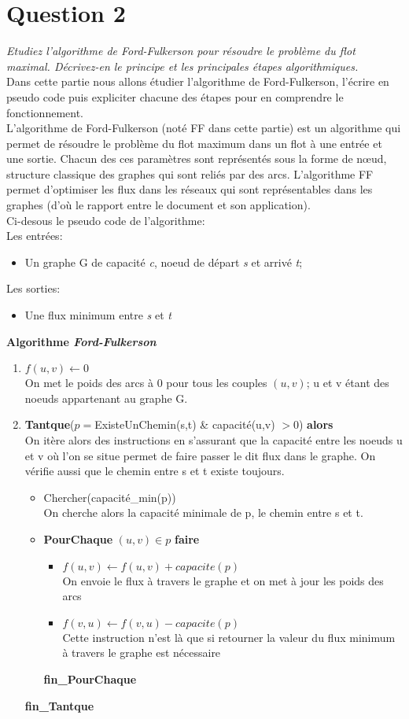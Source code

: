 \section{Question 2}
\textit{Etudiez l'algorithme de Ford-Fulkerson pour résoudre le problème du flot maximal. Décrivez-en le principe et les principales étapes algorithmiques.}\\
Dans cette partie nous allons étudier l’algorithme de Ford-Fulkerson, l’écrire en pseudo code puis expliciter chacune des étapes pour en comprendre le fonctionnement.\\
L'algorithme de Ford-Fulkerson (noté FF dans cette partie) est un algorithme qui permet de résoudre le problème du flot maximum dans un flot à une entrée et une sortie. Chacun des ces paramètres sont représentés sous la forme de nœud, structure classique des graphes qui sont reliés par des arcs. L’algorithme FF permet d'optimiser les flux dans les réseaux qui sont représentables dans les graphes (d'où le rapport entre le document et son application).\\
Ci-desous le pseudo code de l'algorithme:\\
Les entrées:\begin{itemize}
\item Un graphe G de capacité \textit{c}, noeud de départ \textit{s} et arrivé \textit{t};
\end{itemize}
Les sorties:\begin{itemize}
\item Une flux minimum entre \textit{s} et \textit{t}
\end{itemize}
\textbf{Algorithme \textit{Ford-Fulkerson}}
\begin{enumerate}
\item $f(u,v) \leftarrow 0$ \\ On met le poids des arcs à 0 pour tous les couples $(u,v)$; u et v étant des noeuds appartenant au graphe G.
\item \textbf{Tantque}($p=$ExisteUnChemin(s,t) \& capacité(u,v) $> 0$) \textbf{alors}\\
On itère alors des instructions en s'assurant que la capacité entre les noeuds u et v où l'on se situe permet de faire passer le dit flux dans le graphe. On vérifie aussi que le chemin entre s et t existe toujours.
\begin{itemize}
\item Chercher(capacité\_min(p))\\
On cherche alors la capacité minimale de p, le chemin entre s et t.
\item \textbf{PourChaque} $(u,v)\in p$ \textbf{faire}
\begin{itemize}
\item $f(u,v) \leftarrow f(u,v) + capacite(p)$\\
On envoie le flux à travers le graphe et on met à jour les poids des arcs
\item $f(v,u) \leftarrow f(v,u) - capacite(p)$\\
Cette instruction n'est là que si retourner la valeur du flux minimum à travers le graphe est nécessaire
\end{itemize}
\textbf{fin\_PourChaque}
\end{itemize}
\textbf{fin\_Tantque}
\end{enumerate}
